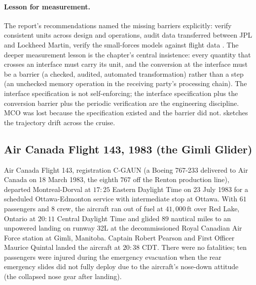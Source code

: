 \paragraph{Lesson for measurement.} The report's recommendations
named the missing barriers explicitly: verify consistent units
across design and operations, audit data transferred between JPL
and Lockheed Martin, verify the small-forces models against flight
data \cite{acc:nasa-mco-mib}. The deeper measurement lesson is the
chapter's central insistence: every quantity that crosses an
interface must carry its unit, and the conversion at the interface
must be a barrier (a checked, audited, automated transformation)
rather than a step (an unchecked memory operation in the receiving
party's processing chain). The interface specification is not
self-enforcing; the interface specification plus the conversion
barrier plus the periodic verification are the engineering
discipline. MCO was lost because the specification existed and the
barrier did not.  sketches the
trajectory drift across the cruise.



\subsection{Air Canada Flight 143, 1983 (the Gimli Glider)}

Air Canada Flight 143, registration C-GAUN (a Boeing 767-233
delivered to Air Canada on 18 March 1983, the eighth $767$ off
the Renton production line), departed Montreal-Dorval at
$17{:}25$ Eastern Daylight Time on 23 July 1983 for a scheduled
Ottawa-Edmonton service with intermediate stop at Ottawa. With
$61$ passengers and $8$ crew, the aircraft ran out of fuel at
$41{,}000\,\text{ft}$ over Red Lake, Ontario at $20{:}11$ Central
Daylight Time and glided $89$ nautical miles to an unpowered
landing on runway 32L at the decommissioned Royal Canadian Air
Force station at Gimli, Manitoba. Captain Robert Pearson and
First Officer Maurice Quintal landed the aircraft at $20{:}38$
CDT. There were no fatalities; ten passengers were injured during
the emergency evacuation when the rear emergency slides did not
fully deploy due to the aircraft's nose-down attitude (the
collapsed nose gear after landing).

